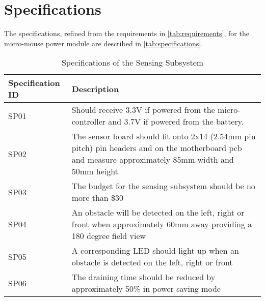 \documentclass[class=report,11pt,crop=false]{standalone}
\begin{document}
\section{Specifications}
The specifications, refined from the requirements in \autoref{tab:requirements}, for the micro-mouse power module are described in \autoref{tab:specifications}.
\begin{table}[h]
    \centering
    \caption{Specifications of the Sensing Subsystem}
    \label{tab:specifications}
    \begin{tabular}{|>{\centering\arraybackslash}m{4cm}|p{10cm}|}
        \hline
        \textbf{Specification ID} & \textbf{Description} \\
        \hline
        SP01 & Should receive 3.3V if powered from the micro-controller and 3.7V if powered from the battery. \\
        \hline
        SP02 & The sensor board should fit onto 2x14 (2.54mm pin pitch) pin headers and on the motherboard pcb and measure approximately 85mm width and 50mm height \\
        \hline
        SP03 & The budget for the sensing subsystem should be no more than \$30 \\
        \hline
        SP04 & An obstacle will be detected on the left, right or front when approximately 60mm away providing a 180 degree field view  \\
        \hline
        SP05 & A corresponding LED should light up when an obstacle is detected on the left, right or front  \\
        \hline
        SP06 & The draining time should be reduced by approximately 50\% in power saving mode\\
        \hline
    \end{tabular}
\end{table}

\end{document}
